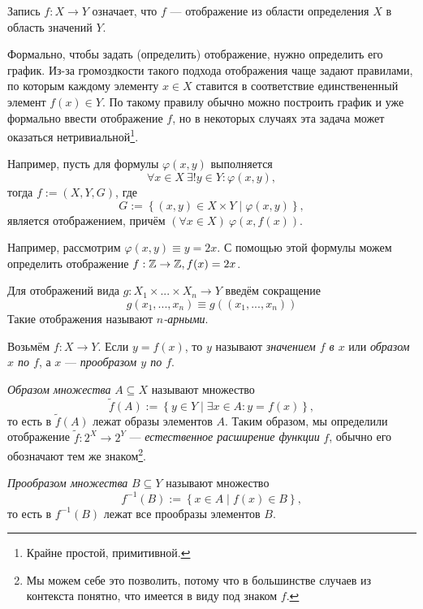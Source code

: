 Запись $f:X\to Y$ означает, что $f$ --- отображение из области определения $X$
в область значений $Y$.

Формально, чтобы задать (определить) отображение, нужно определить его график.
Из-за громоздкости такого подхода отображения чаще задают правилами,
по которым каждому элементу $x\in X$
ставится в соответствие единствененный элемент $f(x)\in Y$.
По такому правилу обычно можно
построить график и уже формально ввести отображение $f$, но в некоторых случаях
эта задача может оказаться нетривиальной\footnote{Крайне простой, примитивной.}.

Например, пусть для формулы $\varphi(x,y)$ выполняется
\[
  \forall x\in X~\exists !y\in Y:\varphi(x,y),
\]
тогда $f:=(X,Y,G)$, где
\[
  G:=\left\{(x,y)\in X\times Y\;\big|\; \varphi(x,y)\right\},
\]
является отображением, причём $(\forall x\in X)~\varphi(x,f(x))$.

Например, рассмотрим ${\varphi(x,y)\equiv y=2x}$.
С помощью этой формулы можем определить отображение $f:\mathbb Z\to\mathbb Z,f(x)=2x$.

Для отображений вида $g:X_1\times ...\times X_{n}\to Y$
введём сокращение
\[
  g(x_1,...,x_{n})\equiv g((x_1,...,x_{n}))
\]
Такие отображения называют {\it $n$-арными}.

Возьмём ${f:X\to Y}$. Если ${y=f(x)}$, то $y$ называют {\it значением $f$ в $x$}
 или {\it образом $x$ по $f$},
а $x$ --- {\it прообразом $y$ по $f$}.

{\it Образом множества} $A\subseteq X$
называют множество
\[
  \widetilde f(A):=\left\{y\in Y\;\big|\; \exists x\in A:y=f(x)\right\},
\]
то есть в $\widetilde f(A)$ лежат образы элементов $A$. Таким образом, мы определили
отображение $\widetilde f:2^{X}\to 2^{Y}$ ---
{\it естественное расширение функции}
$f$, обычно его обозначают
тем же знаком\footnote{Мы можем себе это позволить, потому что
  в большинстве случаев из контекста понятно, что имеется
  в виду под знаком $f$.}.

{\it Прообразом множества}
$B\subseteq Y$ называют множество
\[
  f^{-1}(B):=\left\{x\in A\;\big|\; f(x)\in B\right\},
\]
то есть в $f^{-1}(B)$ лежат все прообразы элементов $B$.


